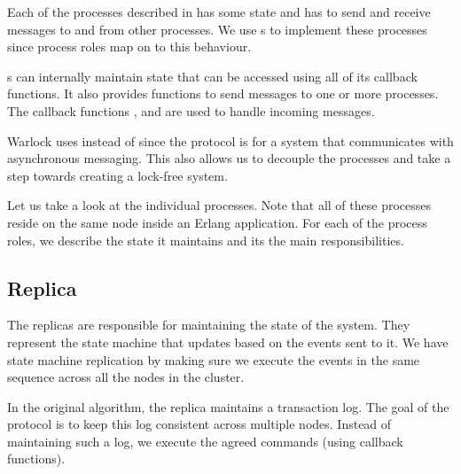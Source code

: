 Each of the processes described in  has some state
and has to send and receive messages to and from other processes. We use
s
 to implement these processes since process roles map
on to this behaviour.

s can internally maintain state that can be accessed using
all of its
callback functions. It also provides functions to send messages%
to one or more processes. The callback functions %
, %
 and %
are used to handle incoming messages.

Warlock uses  instead of  since the
protocol is
for a system that communicates with asynchronous messaging. This also allows us
to decouple the processes and take a step towards creating a lock-free system.

Let us take a look at the individual  processes. Note
that all of these processes reside on the same node inside an
Erlang application. For each of the process roles, we describe the state
it maintains and its the main responsibilities.

\subsection{Replica}

The replicas are responsible for maintaining the state of the system. They
represent the state machine that updates based on the events sent to it. We
have state machine replication by making sure we execute the events in the same
sequence across all the nodes in the cluster.

In the original algorithm, the replica maintains a transaction log. The goal of
the protocol is to keep this log consistent across multiple nodes. Instead of
maintaining such a log, we execute the agreed commands (using callback functions).

